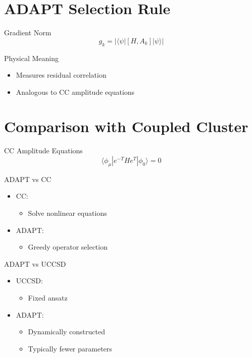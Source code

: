 \documentclass{beamer}
\begin{document}
\section{ADAPT Selection Rule}

\begin{frame}{Gradient Norm}
\[
g_k = |\langle \psi | [H,A_k] | \psi \rangle|
\]
\end{frame}


\begin{frame}{Physical Meaning}
\begin{itemize}
\item Measures residual correlation
\item Analogous to CC amplitude equations
\end{itemize}
\end{frame}

\section{Comparison with Coupled Cluster}

\begin{frame}{CC Amplitude Equations}
\[
\langle \phi_\mu | e^{-T}He^T | \phi_0 \rangle = 0
\]
\end{frame}


\begin{frame}{ADAPT vs CC}
\begin{itemize}
\item CC:
\begin{itemize}
\item Solve nonlinear equations
\end{itemize}
\item ADAPT:
\begin{itemize}
\item Greedy operator selection
\end{itemize}
\end{itemize}
\end{frame}


\begin{frame}{ADAPT vs UCCSD}
\begin{itemize}
\item UCCSD:
\begin{itemize}
\item Fixed ansatz
\end{itemize}
\item ADAPT:
\begin{itemize}
\item Dynamically constructed
\item Typically fewer parameters
\end{itemize}
\end{itemize}
\end{frame}
\end{document}
